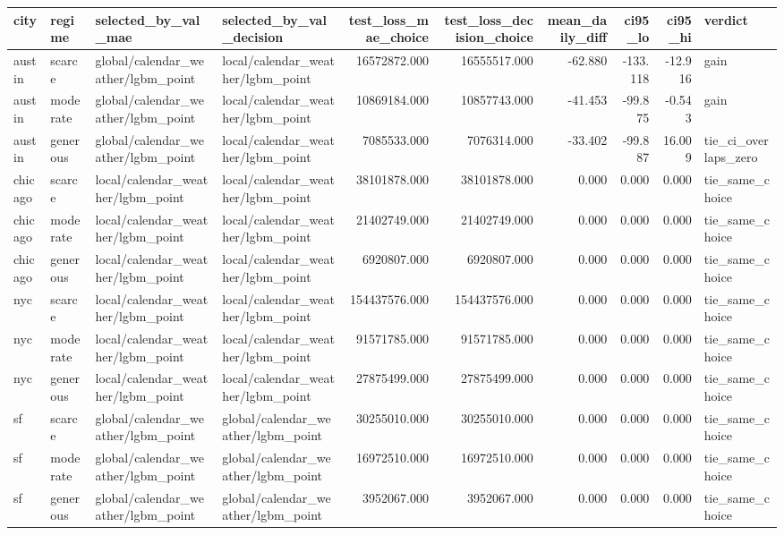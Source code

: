 \begin{tabular}{llllrrrrrl}
\toprule
city & regime & selected\_by\_val\_mae & selected\_by\_val\_decision & test\_loss\_mae\_choice & test\_loss\_decision\_choice & mean\_daily\_diff & ci95\_lo & ci95\_hi & verdict \\
\midrule
austin & scarce & global/calendar\_weather/lgbm\_point & local/calendar\_weather/lgbm\_point & 16572872.000 & 16555517.000 & -62.880 & -133.118 & -12.916 & gain \\
austin & moderate & global/calendar\_weather/lgbm\_point & local/calendar\_weather/lgbm\_point & 10869184.000 & 10857743.000 & -41.453 & -99.875 & -0.543 & gain \\
austin & generous & global/calendar\_weather/lgbm\_point & local/calendar\_weather/lgbm\_point & 7085533.000 & 7076314.000 & -33.402 & -99.887 & 16.009 & tie\_ci\_overlaps\_zero \\
chicago & scarce & local/calendar\_weather/lgbm\_point & local/calendar\_weather/lgbm\_point & 38101878.000 & 38101878.000 & 0.000 & 0.000 & 0.000 & tie\_same\_choice \\
chicago & moderate & local/calendar\_weather/lgbm\_point & local/calendar\_weather/lgbm\_point & 21402749.000 & 21402749.000 & 0.000 & 0.000 & 0.000 & tie\_same\_choice \\
chicago & generous & local/calendar\_weather/lgbm\_point & local/calendar\_weather/lgbm\_point & 6920807.000 & 6920807.000 & 0.000 & 0.000 & 0.000 & tie\_same\_choice \\
nyc & scarce & local/calendar\_weather/lgbm\_point & local/calendar\_weather/lgbm\_point & 154437576.000 & 154437576.000 & 0.000 & 0.000 & 0.000 & tie\_same\_choice \\
nyc & moderate & local/calendar\_weather/lgbm\_point & local/calendar\_weather/lgbm\_point & 91571785.000 & 91571785.000 & 0.000 & 0.000 & 0.000 & tie\_same\_choice \\
nyc & generous & local/calendar\_weather/lgbm\_point & local/calendar\_weather/lgbm\_point & 27875499.000 & 27875499.000 & 0.000 & 0.000 & 0.000 & tie\_same\_choice \\
sf & scarce & global/calendar\_weather/lgbm\_point & global/calendar\_weather/lgbm\_point & 30255010.000 & 30255010.000 & 0.000 & 0.000 & 0.000 & tie\_same\_choice \\
sf & moderate & global/calendar\_weather/lgbm\_point & global/calendar\_weather/lgbm\_point & 16972510.000 & 16972510.000 & 0.000 & 0.000 & 0.000 & tie\_same\_choice \\
sf & generous & global/calendar\_weather/lgbm\_point & global/calendar\_weather/lgbm\_point & 3952067.000 & 3952067.000 & 0.000 & 0.000 & 0.000 & tie\_same\_choice \\
\bottomrule
\end{tabular}
